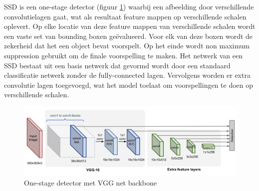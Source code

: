 SSD \cite{liu_ssd_2016} is een one-stage detector (figuur \ref{fig:ssd}) waarbij een afbeelding door verschillende convolutielagen gaat, wat als resultaat feature mappen op verschillende schalen oplevert.
Op elke locatie van deze feature mappen van verschillende schalen wordt een vaste set van bounding boxen ge\"evalueerd.
Voor elk van deze boxen wordt de zekerheid dat het een object bevat voorspelt.
Op het einde wordt non maximum suppression gebruikt om de finale voorspelling te maken.
Het netwerk van een SSD bestaat uit een basis netwerk dat gevormd wordt door een standaard classificatie netwerk zonder de fully-connected lagen.
Vervolgens worden er extra convolutie lagen toegevoegd, wat het model toelaat om voorspellingen te doen op verschillende schalen.

\begin{figure}[!ht]
	\centering
	\includegraphics[width=0.80\linewidth]{fig/SSD.png}
	\caption{One-stage detector met VGG net backbone}
	\label{fig:ssd}
\end{figure}
